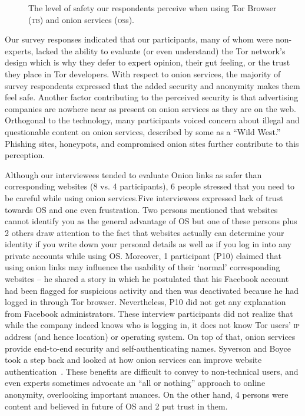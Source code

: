 \begin{figure}[t]
    \centering
    
    \caption{The level of safety our respondents perceive when using Tor
    Browser (\textsc{tb}) and onion services (\textsc{os}s).}
    \label{fig:perceived-security}
\end{figure}

Our survey responses indicated that our participants, many of whom were non-experts,  lacked the ability to evaluate (or even understand) the
Tor network's design which is why they defer to expert opinion, their gut
feeling, or the trust they place in Tor developers.  With respect to onion
services, the majority of survey respondents expressed that the added security and anonymity makes
them feel safe.  Another factor contributing to the perceived security is that
advertising companies are nowhere near as present on onion services as they are
on the web.  Orthogonal to the technology, many participants voiced concern
about illegal and questionable content on onion services, described by some as a
``Wild West.'' Phishing sites, honeypots, and compromised onion sites further
contribute to this perception.

Although our interviewees tended to evaluate Onion links as safer than corresponding websites (8 vs. 4 participants), 6 people stressed that you need to be careful while using onion services.Five interviewees expressed lack of trust towards OS  and one even frustration.  Two persons mentioned that websites cannot identify you as the general advantage of OS but one of these persons plus 2 others draw attention to the fact that websites actually can determine your identity if you write down your personal details as well as if you log in into any private accounts while using OS. Moreover, 1 participant (P10) claimed that using onion links may influence the usability of their ‘normal’ corresponding websites – he shared a story in which he postulated that his Facebook account had been flagged for suspicious activity and then was deactivated because he had logged in through Tor browser.  Nevertheless, P10 did not get any explanation from Facebook administrators. These interview participants did not realize that while the company indeed
knows who is logging in, it does not know Tor users' \textsc{ip} address (and
hence location) or operating system. On top of that, onion services provide
end-to-end security and self-authenticating names.  Syverson and Boyce took a
step back and looked at how onion services can improve website
authentication~\cite{Syverson2015a}.  These benefits are difficult to convey to
non-technical users, and even experts sometimes advocate an ``all or nothing''
approach to online anonymity, overlooking important nuances. On the other hand, 4 persons were content and believed in future of OS and 2 put trust in them.

